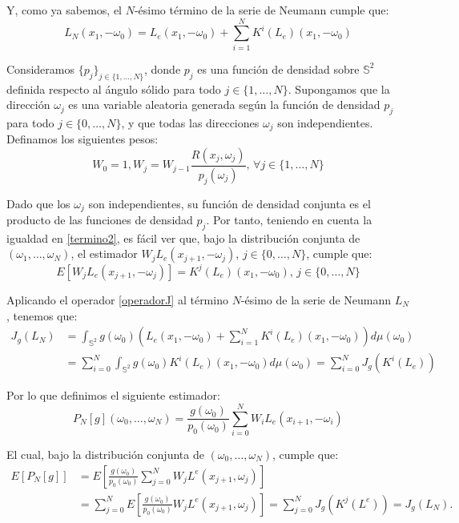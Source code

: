 Y, como ya sabemos, el $N$-ésimo término de la serie de Neumann cumple que:
\begin{equation}\label{termino}
 L_N(x_1, -\omega_0) = L_e(x_1,-\omega_0) + \sum_{i=1}^NK^i(L_e)(x_1, -\omega_0)
\end{equation}

Consideramos $\{p_j\}_{j\in\{1,\ldots ,N\}}$, donde $p_j$ es una función de densidad sobre $\mathds{S}^2$ definida respecto al ángulo sólido para todo $j\in\{1,\ldots,N\}$. Supongamos que la dirección $\omega_j$ es una variable aleatoria generada según la función de densidad $p_j$ para todo $j\in\{0,\ldots,N\}$, y que todas las direcciones $\omega_j$ son independientes. Definamos los siguientes pesos:
$$W_0=1, W_j=W_{j-1}\frac{R(x_j,\omega_j)}{p_j(\omega_j)}\text{, } \forall j\in\{1,\ldots,N\}$$

Dado que los $\omega_j$ son independientes, su función de densidad conjunta es el producto de las funciones de densidad $p_j$. Por tanto, teniendo en cuenta la igualdad en \ref{termino2}, es fácil ver que, bajo la distribución conjunta de $(\omega_1,\ldots ,\omega_N)$, el estimador $W_jL_e(x_{j+1},-\omega_j)$, $j\in\{0,\ldots,N\}$, cumple que:
\begin{equation}\label{EspKLe}
  E[W_jL_e(x_{j+1},-\omega_j)] = K^j(L_e)(x_1, -\omega_0)\text{, } j\in\{0,\ldots,N\}
\end{equation}

Aplicando el operador \ref{operadorJ} al término $N$-ésimo de la serie de Neumann $L_N$, tenemos que:
\begin{align*}
  J_g(L_N)&=\int_{\mathds{S}^2}g(\omega_0)(L_e(x_1,-\omega_0) + \sum_{i=1}^NK^i(L_e)(x_1, -\omega_0))d\mu(\omega_0)\\
  &=\sum_{i=0}^N\int_{\mathds{S}^2}g(\omega_0)K^i(L_e)(x_1, -\omega_0)d\mu(\omega_0) = \sum_{i=0}^NJ_g(K^i(L_e))
\end{align*}

Por lo que definimos el siguiente estimador:
\begin{equation}\label{estPN}
  P_N[g](\omega_0,\ldots ,\omega_N) = \frac{g(\omega_0)}{p_0(\omega_0)}\sum_{i=0}^NW_iL_e(x_{i+1},-\omega_i)
  \end{equation}

El cual, bajo la distribución conjunta de $(\omega_0,\ldots ,\omega_N)$, cumple que:
\begin{align*}
E[P_N[g]]&=E[\frac{g(\omega_0)}{p_0(\omega_0)}\sum_{j=0}^{N}W_jL^e(x_{j+1},\omega_j)]\\
&=\sum_{j=0}^{N}E[\frac{g(\omega_0)}{p_0(\omega_0)}W_jL^e(x_{j+1},\omega_j)]=\sum_{j=0}^{N}J_g(K^j(L^e))=J_g(L_N).
\end{align*}

